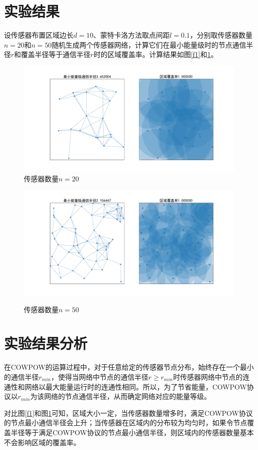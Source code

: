 \documentclass[a4paper]{ctexart}
\begin{document}
\begin{spacing}{1}
		\section{实验结果}
		设传感器布置区域边长$d=10$、蒙特卡洛方法取点间距$l=0.1$，分别取传感器数量$n=20$和$n=50$随机生成两个传感器网络，计算它们在最小能量级时的节点通信半径$r$和覆盖半径等于通信半径$r$时的区域覆盖率。计算结果如图\ref{f1}和\ref{f2}。
		\begin{figure}[h]
			\centering
			\begin{minipage}[htbp]{0.9\textwidth}
				\centering
				\includegraphics[width=\textwidth, keepaspectratio]{figure/f1/r_min.pdf}\\
				\caption{传感器数量$n=20$}\label{f1}
			\end{minipage}
			\hfill
			\hfill
			\begin{minipage}[htbp]{0.9\textwidth}
				\centering
				\includegraphics[width=\textwidth, keepaspectratio]{figure/f2/r_min.pdf}\\
				\caption{传感器数量$n=50$}\label{f2}
			\end{minipage}
		\end{figure}

	\section{实验结果分析}
	在COWPOW的运算过程中，对于任意给定的传感器节点分布，始终存在一个最小的通信半径$r_{min}$，使得当网络中节点的通信半径$r\ge r_{min}$时传感器网络中节点的连通性和网络以最大能量运行时的连通性相同。所以，为了节省能量，COWPOW协议以$r_{min}$为该网络的节点通信半径，从而确定网络对应的能量等级。
	
	对比图\ref{f1}和图\ref{f2}可知，区域大小一定，当传感器数量增多时，满足COWPOW协议的节点最小通信半径会上升；当传感器在区域内的分布较为均匀时，如果令节点覆盖半径等于满足COWPOW协议的节点最小通信半径，则区域内的传感器数量基本不会影响区域的覆盖率。
\end{spacing}
\end{document}
